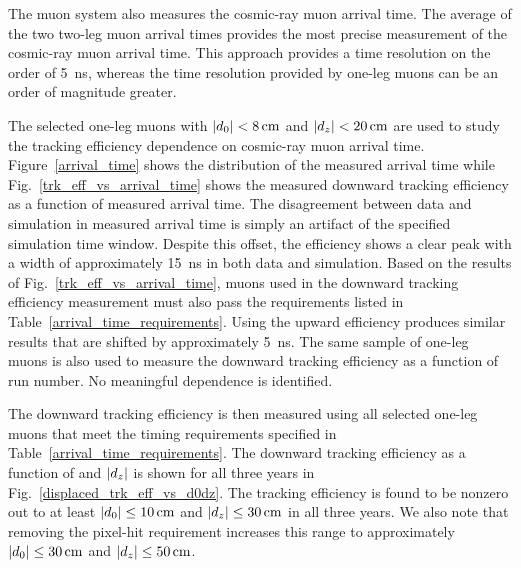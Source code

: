 The muon system also measures the cosmic-ray muon arrival time. The average of the two two-leg muon arrival times provides the most precise measurement of the cosmic-ray muon arrival time. This approach provides a time resolution on the order of \SI{5}{\ns}, whereas the time resolution provided by one-leg muons can be an order of magnitude greater.

The selected one-leg muons with $\ad<\SI{8}{\cm}$ and $\abs{d_z}<\SI{20}{\cm}$ are used to study the tracking efficiency dependence on cosmic-ray muon arrival time. Figure~\ref{arrival_time} shows the distribution of the measured arrival time while Fig.~\ref{trk_eff_vs_arrival_time} shows the measured downward tracking efficiency as a function of measured arrival time. The disagreement between data and simulation in measured arrival time is simply an artifact of the specified simulation time window. Despite this offset, the efficiency shows a clear peak with a width of approximately \SI{15}{\ns} in both data and simulation. Based on the results of Fig.~\ref{trk_eff_vs_arrival_time}, muons used in the downward tracking efficiency measurement must also pass the requirements listed in Table~\ref{arrival_time_requirements}. Using the upward efficiency produces similar results that are shifted by approximately \SI{5}{\ns}. The same sample of one-leg muons is also used to measure the downward tracking efficiency as a function of run number. No meaningful dependence is identified.




The downward tracking efficiency is then measured using all selected one-leg muons that meet the timing requirements specified in Table~\ref{arrival_time_requirements}. The downward tracking efficiency as a function of \ad and $\lvert d_z \rvert$ is shown for all three years in Fig.~\ref{displaced_trk_eff_vs_d0dz}. The tracking efficiency is found to be nonzero out to at least $\ad\leq\SI{10}{\cm}$ and $\abs{d_z}\leq\SI{30}{\cm}$ in all three years. We also note that removing the pixel-hit requirement increases this range to approximately $\ad\leq\SI{30}{\cm}$ and $\abs{d_z}\leq\SI{50}{\cm}$.



